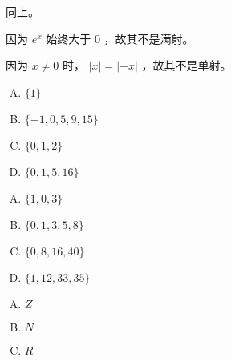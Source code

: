 {{        %
        \begin{practices}
            同上。
        \end{practices}

        \begin{practices}
            因为 $e^x$ 始终大于 $0$ ，故其不是满射。
        \end{practices}

        \begin{practices}
            因为 $x \neq 0$ 时， $|x| = |-x|$ ，故其不是单射。
        \end{practices}

        \begin{practices}
            \begin{enumerate}[A.]
                \item $\{1\}$
                \item $\{-1, 0, 5, 9, 15\}$
                \item $\{0, 1, 2\}$
                \item $\{0, 1, 5, 16\}$
            \end{enumerate}
        \end{practices}

        \begin{practices}
            \begin{enumerate}[A.]
                \item $\{1, 0, 3\}$
                \item $\{0, 1, 3, 5, 8\}$
                \item $\{0, 8, 16, 40\}$
                \item $\{1, 12, 33, 35\}$
            \end{enumerate}
        \end{practices}

        \begin{practices}
            \begin{enumerate}[A.]
                \item $Z$
                \item $N$
                \item $R$
            \end{enumerate}
        \end{practices}

}}
